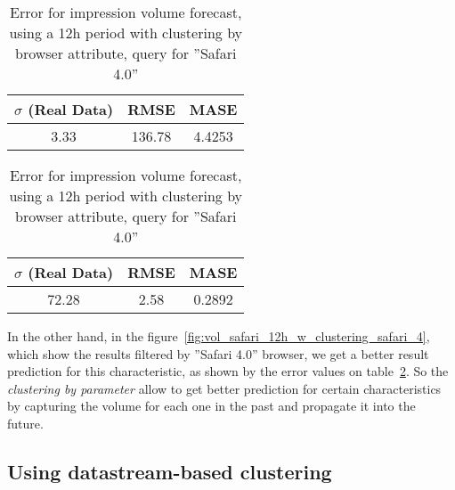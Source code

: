 \begin{table}[!ht]
\centering
\footnotesize
\begin{minipage}[t]{0.45\linewidth}
\centering

\footnotesize
\begin{tabular}{ccc}
 $\sigma$ (Real Data) & RMSE & MASE   \\ \hline
3.33 & 136.78 & 4.4253 \\
\end{tabular}

\vspace{0.5cm}

\caption[Volume
impression forecast, safari]{Error for impression volume
forecast, using a 12h period with clustering by browser attribute}
\label{tab:err_forecast_12_safari_w_clustering}
\end{minipage}
\quad
\begin{minipage}[t]{0.45\linewidth}
\centering
\footnotesize
\begin{tabular}{ccc}
 $\sigma$ (Real Data) & RMSE & MASE   \\ \hline
72.28 & 2.58 & 0.2892 \\
\end{tabular}

\vspace{0.5cm}

\caption[Volume
impression forecast, safari]{Error for impression volume
forecast, using a 12h period with clustering by browser attribute, query for ''Safari 4.0''}
\label{tab:err_forecast_12_safari_w_clustering_safari_4}

\end{minipage}

\end{table}

In the other hand, in the
figure~\ref{fig:vol_safari_12h_w_clustering_safari_4}, which show the results
filtered by ''Safari 4.0'' browser, we get a better result prediction for this
characteristic, as shown by the error values on
table~\ref{tab:err_forecast_12_safari_w_clustering_safari_4}. So the
\emph{clustering by parameter} allow to get better prediction for certain
characteristics by capturing the volume for each one in the past and propagate
it into the future.

\subsection*{Using datastream-based clustering}

